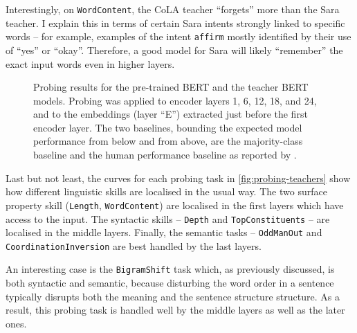 \documentclass[bsc,frontabs,singlespacing,parskip,deptreport]{infthesis}
\begin{document}
{{{      Interestingly, on \verb|WordContent|, the CoLA teacher ``forgets'' more than the Sara teacher. I explain this in terms of certain Sara intents strongly linked to specific words -- for example, examples of the intent \verb|affirm| mostly identified by their use of ``yes'' or ``okay''. Therefore, a good model for Sara will likely ``remember'' the exact input words even in higher layers.

      \begin{figure}[h!tb]
        \centering
        \caption{Probing results for the pre-trained BERT and the teacher BERT models. Probing was applied to encoder layers 1, 6, 12, 18, and 24, and to the embeddings (layer ``E'') extracted just before the first encoder layer. The two baselines, bounding the expected model performance from below and from above, are the majority-class baseline and the human performance baseline as reported by \citet{Conneau_2018}.}
        \label{fig:probing-teachers}
      \end{figure}

      Last but not least, the curves for each probing task in \autoref{fig:probing-teachers} show how different linguistic skills are localised in the usual way. The two surface property skill (\verb|Length|, \verb|WordContent|) are localised in the first layers which have access to the input. The syntactic skills -- \verb|Depth| and \verb|TopConstituents| -- are localised in the middle layers. Finally, the semantic tasks -- \verb|OddManOut| and \verb|CoordinationInversion| are best handled by the last layers.
      
      An interesting case is the \verb|BigramShift| task which, as previously discussed, is both syntactic and semantic, because disturbing the word order in a sentence typically disrupts both the meaning and the sentence structure structure. As a result, this probing task is handled well by the middle layers as well as the later ones.
      
}}}
\end{document}
